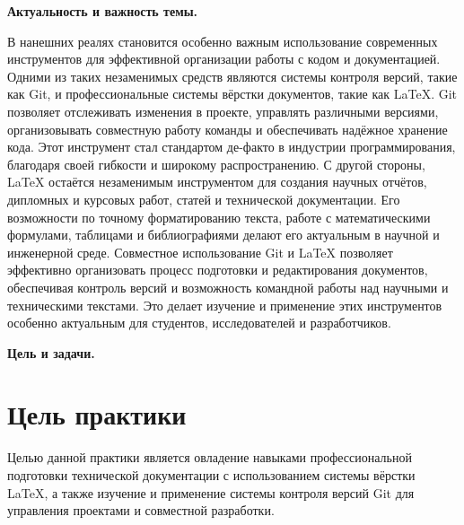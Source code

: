 \documentclass[a4paper,12pt]{report}
\begin{document}



\clearpage
\tableofcontents

\introChapter

\textbf{Актуальность и важность темы.}

В нанешних реалях становится особенно важным использование современных инструментов для эффективной организации работы с кодом и документацией. 
Одними из таких незаменимых средств являются системы контроля версий, такие как Git, и профессиональные системы вёрстки документов, такие как LaTeX.
Git позволяет отслеживать изменения в проекте, управлять различными версиями, организовывать совместную работу команды и обеспечивать надёжное хранение кода. Этот инструмент стал стандартом де-факто в индустрии программирования, благодаря своей гибкости и широкому распространению.
С другой стороны, LaTeX остаётся незаменимым инструментом для создания научных отчётов, дипломных и курсовых работ, статей и технической документации. Его возможности по точному форматированию текста, работе с математическими формулами, таблицами и библиографиями делают его актуальным в научной и инженерной среде.
Совместное использование Git и LaTeX позволяет эффективно организовать процесс подготовки и редактирования документов, обеспечивая контроль версий и возможность командной работы над научными и техническими текстами. Это делает изучение и применение этих инструментов особенно актуальным для студентов, исследователей и разработчиков.

\textbf{Цель и задачи.}
\section*{Цель практики}
Целью данной практики является овладение навыками профессиональной подготовки технической документации с использованием системы вёрстки \LaTeX{}, а также изучение и применение системы контроля версий Git для управления проектами и совместной разработки.
\end{document}
